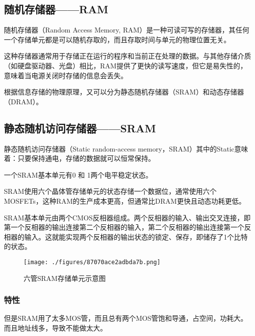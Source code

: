 
\begin{issues}
\issueDraft
\end{issues}

\subsection{随机存储器——RAM}

随机存储器（Random Access Memory, RAM）是一种可读可写的存储器，其任何一个存储单元都是可以随机存取的，而且存取时间与单元的物理位置无关。

这种存储器通常用于存储正在运行的程序和当前正在处理的数据。与其他存储介质（如硬盘驱动器、光盘）相比，RAM提供了更快的读写速度，但它是易失性的，意味着当电源关闭时存储的信息会丢失。

根据信息存储的物理原理，又可以分为静态随机存储器（SRAM）和动态存储器（DRAM）。




\subsection{静态随机访问存储器——SRAM}

静态随机访问存储器（Static random-access memory，SRAM）其中的Static意味着：只要保持通电，存储的数据就可以恒常保持。

一个SRAM基本单元有0 和 1两个电平稳定状态。

SRAM使用六个晶体管存储单元的状态存储一个数据位，通常使用六个MOSFETs，这种RAM的生产成本更高，但通常比DRAM更快且动态功耗更低。

SRAM基本单元由两个CMOS反相器组成。两个反相器的输入、输出交叉连接，即第一个反相器的输出连接第二个反相器的输入，第二个反相器的输出连接第一个反相器的输入。这就能实现两个反相器的输出状态的锁定、保存，即储存了1个比特的状态。

\begin{figure}[ht]
\centering
\texttt{[image: ./figures/87070ace2adbda7b.png]}
\caption{六管SRAM存储单元示意图} \label{fig_RAM_3}
\end{figure}




\subsubsection{特性}

但是SRAM用了太多MOS管，而且总有两个MOS管饱和导通，占空间，功耗大。而且地址线多，导致不能做太大。

